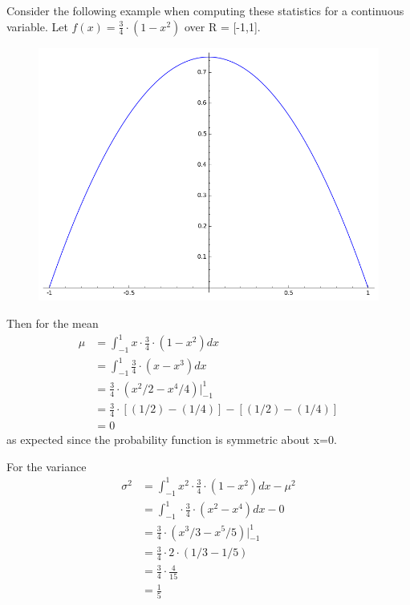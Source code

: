\documentclass[10pt,]{book}
\numberwithin{equation}{section}
\begin{document}
%
\par
\hypertarget{p-758}{}%
Consider the following example when computing these statistics for a continuous variable. Let \(f(x) = \frac{3}{4} \cdot (1-x^2)\) over R = [-1,1]. \begin{figure}\centering\includegraphics[width=1\linewidth]{images/ContinuousDistributionExample.png}
\end{figure}%
\par
\hypertarget{p-759}{}%
Then for the mean%
\begin{align*}
\mu & = \int_{-1}^1 x \cdot \frac{3}{4} \cdot (1-x^2) dx\\
& = \int_{-1}^1 \frac{3}{4} \cdot (x-x^3) dx\\
& = \frac{3}{4} \cdot (x^2/2-x^4/4) \big |_{-1}^1\\
& = \frac{3}{4} \cdot [(1/2)-(1/4)] - [(1/2) - (1/4)]\\
& = 0
\end{align*}
as expected since the probability function is symmetric about x=0.%
\par
\hypertarget{p-760}{}%
For the variance%
\begin{align*}
\sigma^2 & = \int_{-1}^1 x^2 \cdot \frac{3}{4} \cdot (1-x^2) dx - \mu^2\\
& = \int_{-1}^1 \cdot \frac{3}{4} \cdot (x^2-x^4) dx - 0\\
& = \frac{3}{4} \cdot (x^3 /3 -x^5 / 5) \big |_{-1}^1\\
& = \frac{3}{4} \cdot 2 \cdot (1/3-1/5)\\
& = \frac{3}{4} \cdot \frac{4}{15}\\
& = \frac{1}{5}
\end{align*}
\end{document}
